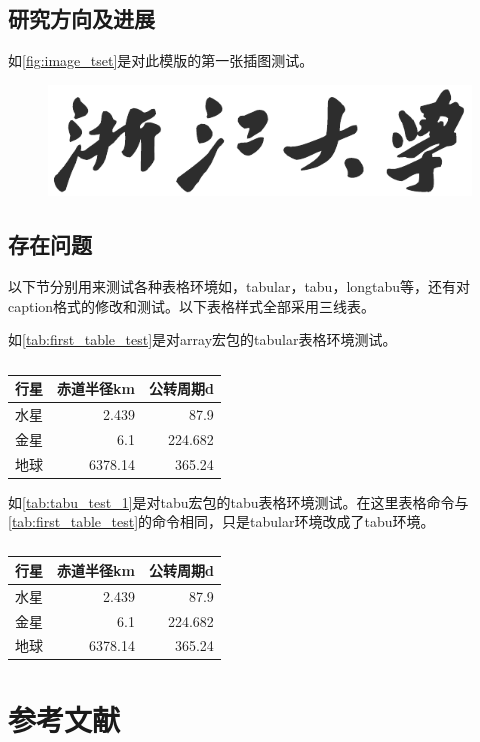 		\subsection{研究方向及进展} %
		\label{sub:研究方向及进展}
			如\autoref{fig:image_tset}是对此模版的第一张插图测试。

			\begin{figure}[htbp]
				\centering
				\includegraphics[width = 0.5\linewidth]{./style/logo/ZJDX.pdf}
				\caption{}
				\label{fig:image_tset}
			\end{figure}
		\subsection{存在问题} %
		\label{sub:存在问题}
			以下节分别用来测试各种表格环境如，tabular，tabu，longtabu等，还有对caption格式的修改和测试。以下表格样式全部采用三线表。

			
			如\autoref{tab:first_table_test}是对array宏包的tabular表格环境测试。
			\begin{table}[htbp]
				\centering
				\renewcommand{\arraystretch}{0.625}
				\caption{}
				\label{tab:first_table_test}
			    \begin{tabular}{lrr}
			    \toprule
			    \textbf{行星}     & \textbf{赤道半径}km & \textbf{公转周期}d \\
			    \midrule
			    水星     & 2.439  & 87.9 \\
			    金星     & 6.1    & 224.682 \\
			    地球     & 6378.14 & 365.24 \\
			    \bottomrule
			    \end{tabular}%
			\end{table}

			
			如\autoref{tab:tabu_test_1}是对tabu宏包的tabu表格环境测试。在这里表格命令与\autoref{tab:first_table_test}的命令相同，只是tabular环境改成了tabu环境。
			\begin{table}[htbp]
				\centering
				\renewcommand{\arraystretch}{0.625}
				\caption{}
				\label{tab:tabu_test_1}
			    \begin{tabu}{lrr}
			    \toprule
			    \textbf{行星}     & \textbf{赤道半径}km & \textbf{公转周期}d \\
			    \midrule
			    水星     & 2.439  & 87.9 \\
			    金星     & 6.1    & 224.682 \\
			    地球     & 6378.14 & 365.24 \\
			    \bottomrule
			    \end{tabu}%
			\end{table}
	\newpage
	\section*{参考文献} %
	\label{sec:参考文献1}

